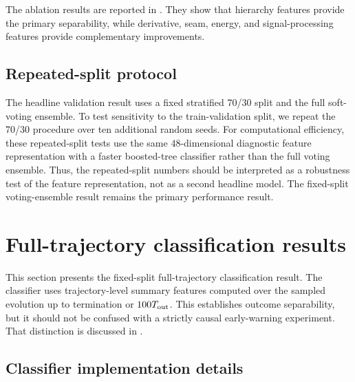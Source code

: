 \documentclass[12pt,a4paper]{article}
\newcommand{\Tout}{T_{\rm out}}
\begin{document}
The ablation results are reported in . They show that hierarchy features provide the primary separability, while derivative, seam, energy, and signal-processing features provide complementary improvements.

\subsection{Repeated-split protocol}
\label{sec:repeated_split_protocol}

The headline validation result uses a fixed stratified 70/30 split and the full soft-voting ensemble. To test sensitivity to the train-validation split, we repeat the 70/30 procedure over ten additional random seeds. For computational efficiency, these repeated-split tests use the same 48-dimensional diagnostic feature representation with a faster boosted-tree classifier rather than the full voting ensemble. Thus, the repeated-split numbers should be interpreted as a robustness test of the feature representation, not as a second headline model. The fixed-split voting-ensemble result remains the primary performance result.

\section{Full-trajectory classification results}
\label{sec:full_trajectory_results}

This section presents the fixed-split full-trajectory classification result. The classifier uses trajectory-level summary features computed over the sampled evolution up to termination or \(100\Tout\). This establishes outcome separability, but it should not be confused with a strictly causal early-warning experiment. That distinction is discussed in .


\subsection{Classifier implementation details}
\label{sec:classifier_details}
\end{document}
